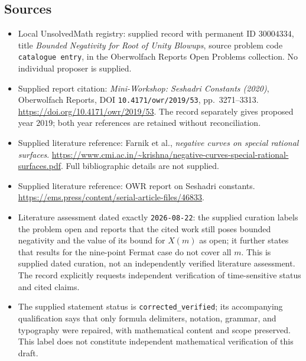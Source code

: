 \documentclass[11pt]{article}
\begin{document}
\subsection{Sources}
\begin{itemize}
\item Local UnsolvedMath registry: supplied record with permanent ID \(30004334\), title \emph{Bounded Negativity for Root of Unity Blowups}, source problem code \texttt{catalogue entry}, in the Oberwolfach Reports Open Problems collection. No individual proposer is supplied.
\item Supplied report citation: \emph{Mini-Workshop: Seshadri Constants (2020)}, Oberwolfach Reports, DOI \texttt{10.4171/owr/2019/53}, pp.~3271--3313. \url{https://doi.org/10.4171/owr/2019/53}. The record separately gives proposed year \(2019\); both year references are retained without reconciliation.
\item Supplied literature reference: Farnik et al., \emph{negative curves on special rational surfaces}. \url{https://www.cmi.ac.in/~krishna/negative-curves-special-rational-surfaces.pdf}. Full bibliographic details are not supplied.
\item Supplied literature reference: OWR report on Seshadri constants. \url{https://ems.press/content/serial-article-files/46833}.
\item Literature assessment dated exactly \texttt{2026-08-22}: the supplied curation labels the problem open and reports that the cited work still poses bounded negativity and the value of its bound for \(X(m)\) as open; it further states that results for the nine-point Fermat case do not cover all \(m\). This is supplied dated curation, not an independently verified literature assessment. The record explicitly requests independent verification of time-sensitive status and cited claims.
\item The supplied statement status is \texttt{corrected\_verified}; its accompanying qualification says that only formula delimiters, notation, grammar, and typography were repaired, with mathematical content and scope preserved. This label does not constitute independent mathematical verification of this draft.
\end{itemize}
\end{document}
